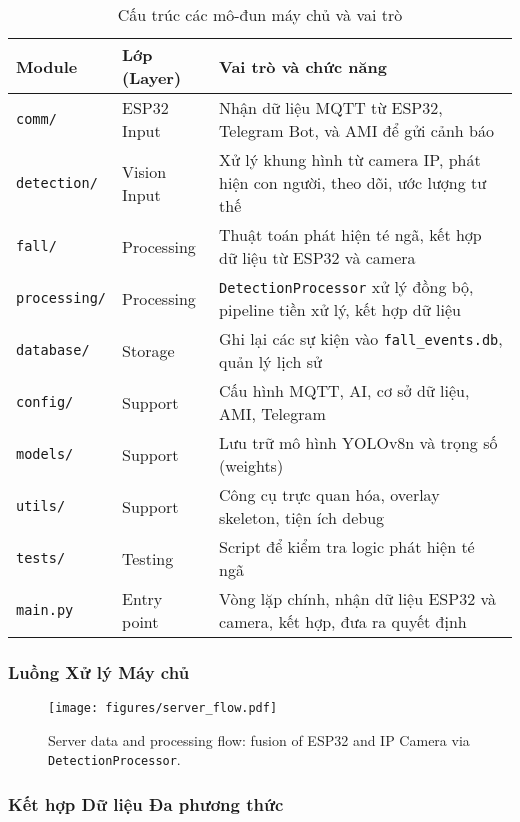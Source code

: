 \begin{table}[H]
\centering
\caption{Cấu trúc các mô-đun máy chủ và vai trò}
\label{tab:server_modules}
\begin{tabular}{|l|l|p{7cm}|}
\hline
\textbf{Module} & \textbf{Lớp (Layer)} & \textbf{Vai trò và chức năng} \\
\hline
\texttt{comm/} & ESP32 Input & Nhận dữ liệu MQTT từ ESP32, Telegram Bot, và AMI để gửi cảnh báo \\
\hline
\texttt{detection/} & Vision Input & Xử lý khung hình từ camera IP, phát hiện con người, theo dõi, ước lượng tư thế \\
\hline
\texttt{fall/} & Processing & Thuật toán phát hiện té ngã, kết hợp dữ liệu từ ESP32 và camera \\
\hline
\texttt{processing/} & Processing & \texttt{DetectionProcessor} xử lý đồng bộ, pipeline tiền xử lý, kết hợp dữ liệu \\
\hline
\texttt{database/} & Storage & Ghi lại các sự kiện vào \texttt{fall\_events.db}, quản lý lịch sử \\
\hline
\texttt{config/} & Support & Cấu hình MQTT, AI, cơ sở dữ liệu, AMI, Telegram \\
\hline
\texttt{models/} & Support & Lưu trữ mô hình YOLOv8n và trọng số (weights) \\
\hline
\texttt{utils/} & Support & Công cụ trực quan hóa, overlay skeleton, tiện ích debug \\
\hline
\texttt{tests/} & Testing & Script để kiểm tra logic phát hiện té ngã \\
\hline
\texttt{main.py} & Entry point & Vòng lặp chính, nhận dữ liệu ESP32 và camera, kết hợp, đưa ra quyết định \\
\hline
\end{tabular}
\end{table}

\subsubsection{Luồng Xử lý Máy chủ}
\label{subsubsec:server_flow}

\begin{figure}[H]
\centering
\texttt{[image: figures/server\_flow.pdf]}
\caption{Server data and processing flow: fusion of ESP32 and IP Camera via \texttt{DetectionProcessor}.}
\label{fig:server_flow}
\end{figure}

\subsubsection{Kết hợp Dữ liệu Đa phương thức}
\label{subsubsec:multi_input_fusion}

